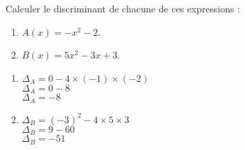 \documentclass[a4paper,11pt,exos]{nsi} %
\begin{document}

\maketitle

\begin{exercice}
    Calculer le discriminant de chacune de ces expressions :
    \begin{multicols}{2}
        \begin{enumerate}
            \item $A(x) = -x^2-2$.
	        \item $B(x) = 5x^2-3x+3$.
        \end{enumerate}
    \end{multicols}
    
\end{exercice}

    \begin{multicols}{2}
        \begin{enumerate}
            \item$\Delta_A = 0-4\times\left(-1\right)\times\left(-2\right)$\\
                $\Delta_A = 0-8$\\
                $\Delta_A=-8$
        
            \item $\Delta_B =\left(-3\right)^2-4\times5\times3$\\
            $\Delta_B=9-60$\\
            $\Delta_B=-51$
        \end{enumerate}
    \end{multicols}
\end{document}
